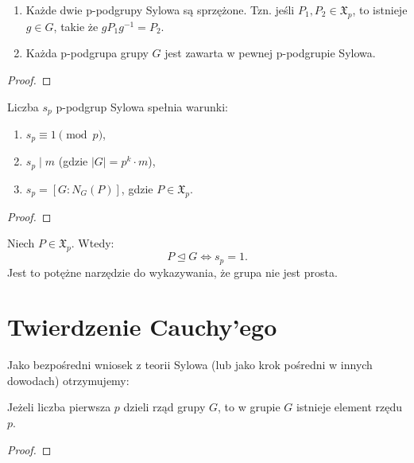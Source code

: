 \begin{theorem}
    \begin{enumerate}
        \item Każde dwie p-podgrupy Sylowa są sprzężone. Tzn. jeśli $P_1, P_2 \in \mathfrak{X}_p$, to istnieje $g \in G$, takie że $g P_1 g^{-1} = P_2$.
        \item Każda p-podgrupa grupy $G$ jest zawarta w pewnej p-podgrupie Sylowa.
    \end{enumerate}
\end{theorem}
\begin{proof}
\end{proof}

\begin{theorem}
    Liczba $s_p$ p-podgrup Sylowa spełnia warunki:
    \begin{enumerate}
        \item $s_p \equiv 1 \pmod{p}$,
        \item $s_p \mid m$ (gdzie $|G| = p^k \cdot m$),
        \item $s_p = [G : N_G(P)]$, gdzie $P \in \mathfrak{X}_p$.
    \end{enumerate}
\end{theorem}
\begin{proof}
\end{proof}

\begin{corollary}
    Niech $P \in \mathfrak{X}_p$. Wtedy:
    \[ P \unlhd G \iff s_p = 1. \]
    Jest to potężne narzędzie do wykazywania, że grupa nie jest prosta.
\end{corollary}

\section{Twierdzenie Cauchy'ego}

Jako bezpośredni wniosek z teorii Sylowa (lub jako krok pośredni w innych dowodach) otrzymujemy:

\begin{theorem}[Cauchy]
    Jeżeli liczba pierwsza $p$ dzieli rząd grupy $G$, to w grupie $G$ istnieje element rzędu $p$.
\end{theorem}
\begin{proof}
\end{proof}

